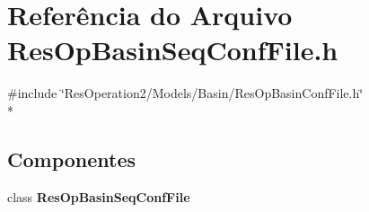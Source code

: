 \section{Referência do Arquivo Res\+Op\+Basin\+Seq\+Conf\+File.\+h}
\label{_res_op_basin_seq_conf_file_8h}
{\ttfamily \#include \char`\"{}Res\+Operation2/\+Models/\+Basin/\+Res\+Op\+Basin\+Conf\+File.\+h\char`\"{}}\\*
\subsection*{Componentes}
\begin{DoxyCompactItemize}
\item 
class {\bf Res\+Op\+Basin\+Seq\+Conf\+File}
\end{DoxyCompactItemize}
